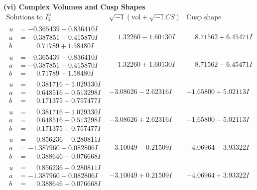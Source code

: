 \documentclass[1p]{elsarticle_modified}
\theoremstyle{definition}
\newcommand{\I}{\sqrt{-1}}
\begin{document}
\newpage\flushleft \textbf{(vi) Complex Volumes and Cusp Shapes}
$$\begin{array}{c|c|c}  
\text{Solutions to }I^u_{2}& \I (\text{vol} + \sqrt{-1}CS) & \text{Cusp shape}\\
 \hline 
\begin{aligned}
u &= -0.365439 + 0.836410 I \\
a &= -0.387851 + 0.415870 I \\
b &= \phantom{-}0.71789 + 1.58480 I\end{aligned}
 & \phantom{-}1.32260 - 1.60130 I & \phantom{-}8.71562 + 6.45471 I \\ \hline\begin{aligned}
u &= -0.365439 - 0.836410 I \\
a &= -0.387851 - 0.415870 I \\
b &= \phantom{-}0.71789 - 1.58480 I\end{aligned}
 & \phantom{-}1.32260 + 1.60130 I & \phantom{-}8.71562 - 6.45471 I \\ \hline\begin{aligned}
u &= \phantom{-}0.381716 + 1.029330 I \\
a &= \phantom{-}0.648516 - 0.513298 I \\
b &= \phantom{-}0.171375 + 0.757477 I\end{aligned}
 & -3.08626 - 2.62316 I & -1.65800 + 5.02113 I \\ \hline\begin{aligned}
u &= \phantom{-}0.381716 - 1.029330 I \\
a &= \phantom{-}0.648516 + 0.513298 I \\
b &= \phantom{-}0.171375 - 0.757477 I\end{aligned}
 & -3.08626 + 2.62316 I & -1.65800 - 5.02113 I \\ \hline\begin{aligned}
u &= \phantom{-}0.856236 + 0.280811 I \\
a &= -1.387960 + 0.082806 I \\
b &= \phantom{-}0.388646 + 0.076668 I\end{aligned}
 & -3.10049 - 0.21509 I & -4.06964 - 3.93322 I \\ \hline\begin{aligned}
u &= \phantom{-}0.856236 - 0.280811 I \\
a &= -1.387960 - 0.082806 I \\
b &= \phantom{-}0.388646 - 0.076668 I\end{aligned}
 & -3.10049 + 0.21509 I & -4.06964 + 3.93322 I \\ \hline\begin{aligned}

\end{aligned}
\end{array}$$
\end{document}
